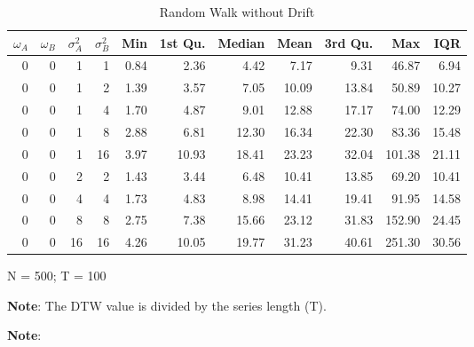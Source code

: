 \documentclass[12pt]{article}
\begin{document}
\begin{table}[!htb]
    \begin{center}
      \begin{tabular}{| r r r r | r r r r r r r |}
        \hline
        $\omega_{A}$ & $\omega_{B}$ & $\sigma^{2}_{A}$ & $\sigma^{2}_{B}$ & Min & 1st Qu. & Median & Mean & 3rd Qu. & Max & IQR \\
        \hline
        0 & 0 & 1  & 1  & 0.84 &  2.36 &  4.42 &  7.17 &  9.31 &  46.87 &  6.94  \\
        \hline
        0 & 0 & 1  & 2  & 1.39 &  3.57 &  7.05 & 10.09 & 13.84 &  50.89 & 10.27  \\
        0 & 0 & 1  & 4  & 1.70 &  4.87 &  9.01 & 12.88 & 17.17 &  74.00 & 12.29  \\
        0 & 0 & 1  & 8  & 2.88 &  6.81 & 12.30 & 16.34 & 22.30 &  83.36 & 15.48  \\
        0 & 0 & 1  & 16 & 3.97 & 10.93 & 18.41 & 23.23 & 32.04 & 101.38 & 21.11  \\
        \hline
        0 & 0 & 2  & 2  & 1.43 &  3.44 &  6.48 & 10.41 & 13.85 &  69.20 & 10.41  \\
        0 & 0 & 4  & 4  & 1.73 &  4.83 &  8.98 & 14.41 & 19.41 &  91.95 & 14.58  \\
        0 & 0 & 8  & 8  & 2.75 &  7.38 & 15.66 & 23.12 & 31.83 & 152.90 & 24.45  \\
        0 & 0 & 16 & 16 & 4.26 & 10.05 & 19.77 & 31.23 & 40.61 & 251.30 & 30.56  \\
        \hline
      \end{tabular}
    \caption{Random Walk without Drift}
    \end{center}
    \begin{tablenotes}
        \item{\footnotesize N = 500; T = 100}
        \item {\footnotesize \textbf{Note}: The DTW value is divided by the series length (T).}
        \item{\footnotesize \textbf{Note}: }
    \end{tablenotes}
\end{table}
\end{document}
